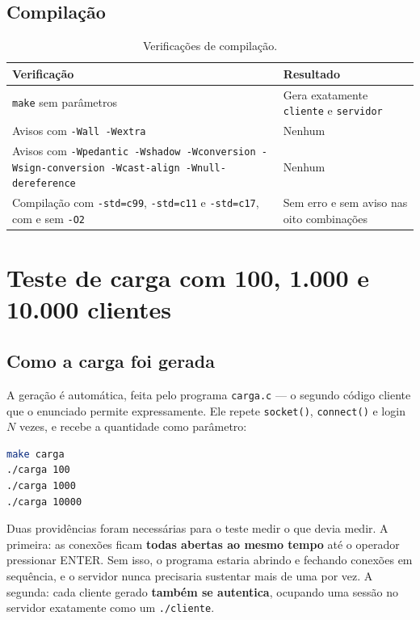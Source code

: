 \documentclass[12pt,a4paper]{article}
\begin{document}
\subsection{Compilação}

\begin{table}[H]
\centering
\caption{Verificações de compilação.}
\small
\begin{tabular}{L{7.6cm} L{5.4cm}}
\toprule
\textbf{Verificação} & \textbf{Resultado} \\
\midrule
\texttt{make} sem parâmetros & Gera exatamente \texttt{cliente} e \texttt{servidor} \\
Avisos com \texttt{-Wall -Wextra} & Nenhum \\
Avisos com \texttt{-Wpedantic -Wshadow -Wconversion -Wsign-conversion -Wcast-align -Wnull-dereference} & Nenhum \\
Compilação com \texttt{-std=c99}, \texttt{-std=c11} e \texttt{-std=c17}, com e sem \texttt{-O2} & Sem erro e sem aviso nas oito combinações \\
\bottomrule
\end{tabular}
\end{table}

\section{Teste de carga com 100, 1.000 e 10.000 clientes}

\subsection{Como a carga foi gerada}

A geração é automática, feita pelo programa \texttt{carga.c} --- o segundo
código cliente que o enunciado permite expressamente. Ele repete
\texttt{socket()}, \texttt{connect()} e login $N$ vezes, e recebe a quantidade
como parâmetro:

\begin{lstlisting}[caption={Comandos usados no teste de carga.},language=bash]
make carga
./carga 100
./carga 1000
./carga 10000
\end{lstlisting}

Duas providências foram necessárias para o teste medir o que devia medir. A
primeira: as conexões ficam \textbf{todas abertas ao mesmo tempo} até o operador
pressionar ENTER. Sem isso, o programa estaria abrindo e fechando conexões em
sequência, e o servidor nunca precisaria sustentar mais de uma por vez. A
segunda: cada cliente gerado \textbf{também se autentica}, ocupando uma sessão
no servidor exatamente como um \texttt{./cliente}.
\end{document}
